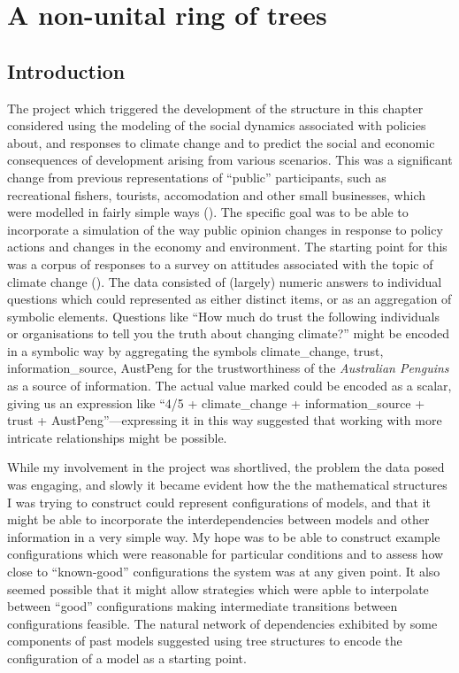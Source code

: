 \chapter[A RING OF TREES]{A non-unital ring of trees}\label{treering}
\section{Introduction}
The project which triggered the development of the structure in this
chapter considered using the modeling of the social dynamics
associated with policies about, and responses to climate change and to
predict the social and economic consequences of development arising
from various scenarios. This was a significant change from previous
representations of ``public'' participants, such as recreational
fishers, tourists, accomodation and other small businesses, which were
modelled in fairly simple ways (\cite{Fulton2011ningaloo,Gray2014}).
The specific goal was to be able to incorporate a simulation of the
way public opinion changes in response to policy actions and changes
in the economy and environment.  The starting point for this was a
corpus of responses to a survey on attitudes associated with the topic
of climate change (\cite{boschetti2012}). The data consisted of
(largely) numeric answers to individual questions which could
represented as either distinct items, or as an aggregation of symbolic
elements.  Questions like ``How much do trust the following
individuals or organisations to tell you the truth about changing
climate?'' might be encoded in a symbolic way by aggregating the
symbols \textsf{climate\_change, trust, information\_source, AustPeng}
for the trustworthiness of the \emph{Australian Penguins} as a source
of information. The actual value marked could be encoded as a scalar,
giving us an expression like ``\textsf{4/5 + climate\_change +
  information\_source + trust + AustPeng}''---expressing it in this
way suggested that working with more intricate relationships might be
possible.

While my involvement in the project was shortlived, the problem the
data posed was engaging, and slowly it became evident how the the
mathematical structures I was trying to construct could represent
configurations of models, and that it might be able to incorporate the
interdependencies between models and other information in a very
simple way.  My hope was to be able to construct example
configurations which were reasonable for particular conditions and to
assess how close to ``known-good'' configurations the system was at
any given point.  It also seemed possible that it might allow
strategies which were apble to interpolate between ``good''
configurations making intermediate transitions between configurations
feasible. The natural network of dependencies exhibited by some
components of past models suggested using tree structures to encode
the configuration of a model as a starting point.

